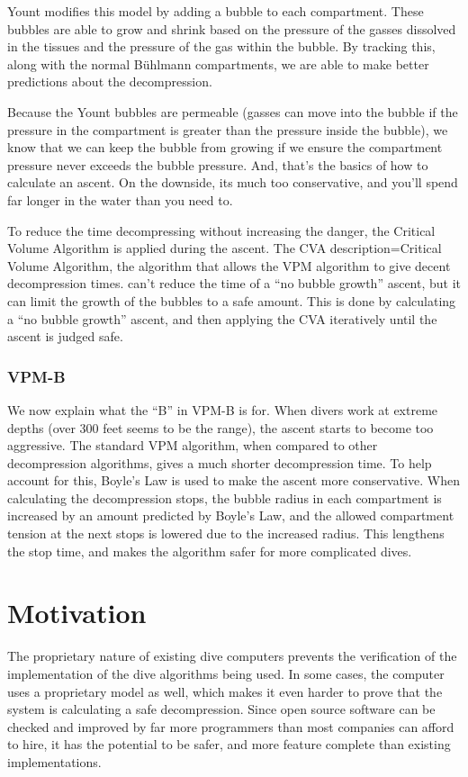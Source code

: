 \documentclass[12pt]{article}
\begin{document}
 Yount modifies this model by adding a bubble to each compartment. These bubbles are able to grow and
shrink based on the pressure of the gasses dissolved in the tissues and the pressure of the gas within the
bubble. By tracking this, along with the normal B\"uhlmann compartments, we are able to make better
predictions about the decompression.

Because the Yount bubbles are permeable (gasses can move into the bubble if the pressure in the compartment
is greater than the pressure inside the bubble), we know that we can keep the bubble from growing if we
ensure the compartment pressure never exceeds the bubble pressure. And, that's the basics of how to calculate
an ascent. On the downside, its much too conservative, and you'll spend far longer in the water than you need
to.

To reduce the time decompressing without increasing the danger, the Critical Volume Algorithm is applied
during the ascent. The CVA { description={Critical Volume Algorithm, the algorithm that allows the VPM algorithm to give decent decompression times.}}
can't reduce the time of a ``no bubble growth'' ascent, but it can limit
the growth of the bubbles to a safe amount. This is done by calculating a ``no bubble growth'' ascent,
and then applying the CVA iteratively until the ascent is judged safe.

\subsubsection{VPM-B}

 We now explain what the ``B'' in VPM-B is for. When divers work at extreme
depths (over 300 feet seems to be the range), the ascent starts to become too aggressive. The standard VPM
algorithm, when compared to other decompression algorithms, gives a much shorter decompression time. To help account
for this, Boyle's Law is used to make the ascent more conservative. When calculating the
decompression stops, the bubble radius in each compartment is increased by an amount predicted by Boyle's Law,
and the allowed compartment tension at the next stops is lowered due to the increased radius. This
lengthens the stop time, and makes the algorithm safer for more complicated dives.

\section{Motivation}

The proprietary nature of existing dive computers prevents the verification of the implementation of
the dive algorithms being used. In some cases, the computer uses a proprietary model as well, which
makes it even harder to prove that the system is calculating a safe decompression. Since open source
software can be checked and improved by far more programmers than most companies can afford to hire,
it has the potential to be safer, and more feature complete than existing implementations.
\end{document}
